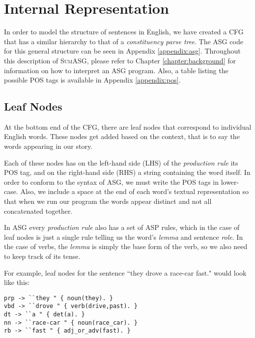 \section{Internal Representation}
\label{sec:internal_representation}

In order to model the structure of sentences in English, we have created a CFG that has a similar hierarchy to that of a \textit{constituency parse tree}. The ASG code for this general structure can be seen in Appendix \ref{appendix:asg}. Throughout this description of \textsc{SumASG}, please refer to Chapter \ref{chapter:background} for information on how to interpret an ASG program. Also, a table listing the possible POS tags is available in Appendix \ref{appendix:pos}.

\subsection{Leaf Nodes}

At the bottom end of the CFG, there are leaf nodes that correspond to individual English words. These nodes get added based on the context, that is to say the words appearing in our story.

Each of these nodes has on the left-hand side (LHS) of the \textit{production rule} its POS tag, and on the right-hand side (RHS) a string containing the word itself. In order to conform to the syntax of ASG, we must write the POS tags in lower-case. Also, we include a space at the end of each word's textual representation so that when we run our program the words appear distinct and not all concatenated together.

In ASG every \textit{production rule} also has a set of ASP rules, which in the case of leaf nodes is just a single rule telling us the word's \textit{lemma} and sentence \textit{role}. In the case of verbs, the \textit{lemma} is simply the base form of the verb, so we also need to keep track of its tense.

For example, leaf nodes for the sentence ``they drove a race-car fast." would look like this:

\begin{displayquote}
\begin{lstlisting}
prp -> ``they " { noun(they). }
vbd -> ``drove " { verb(drive,past). }
dt -> ``a " { det(a). }
nn -> ``race-car " { noun(race_car). }
rb -> ``fast " { adj_or_adv(fast). }
\end{lstlisting}
\end{displayquote}

